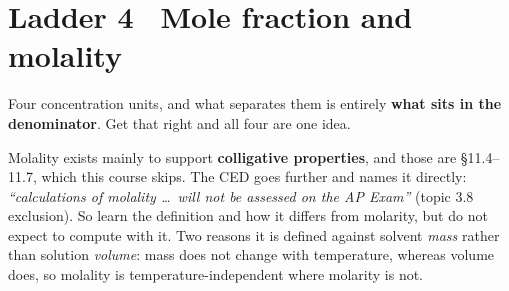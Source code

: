 \documentclass{apchem-worksheet}
\begin{document}
\section*{\sffamily Ladder 4 \textbullet\ Mole fraction and molality}

Four concentration units, and what separates them is entirely
\textbf{what sits in the denominator}. Get that right and all four are
one idea.

\begin{center}
\end{center}

\begin{apcnote}
Molality exists mainly to support \textbf{colligative properties}, and
those are \S11.4--11.7, which this course skips. The CED goes further
and names it directly: \emph{``calculations of molality \ldots\ will not
be assessed on the AP Exam''} (topic 3.8 exclusion). So learn the
definition and how it differs from molarity, but do not expect to
compute with it. Two reasons it is defined against
solvent \emph{mass} rather than solution \emph{volume}: mass does not
change with temperature, whereas volume does, so molality is
temperature-independent where molarity is not.
\end{apcnote}
\end{document}
